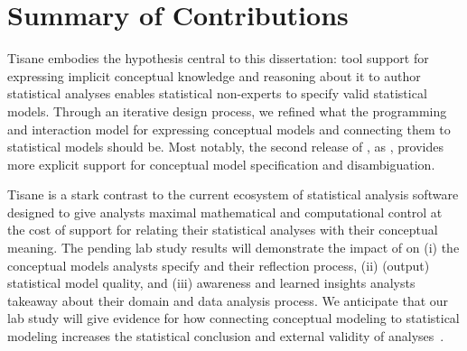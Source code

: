 












\section{Summary of Contributions}


Tisane embodies the hypothesis central to this dissertation: tool support for
expressing implicit conceptual knowledge and reasoning about it to author
statistical analyses enables statistical non-experts to specify valid
statistical models. Through an iterative design process, we refined what the
programming and interaction model for expressing conceptual models and
connecting them to statistical models should be. Most notably, the second
release of \tisane, as \rTisane, provides more explicit support for conceptual
model specification and disambiguation. 

Tisane is a stark contrast to the current ecosystem of statistical analysis
software designed to give analysts maximal mathematical and computational
control at the cost of support for relating their statistical analyses with
their conceptual meaning. The pending lab study results will demonstrate the
impact of \rTisane on (i) the conceptual models analysts specify and their
reflection process, (ii) (output) statistical model quality, and (iii) awareness
and learned insights analysts takeaway about their domain and data analysis
process. We anticipate that our lab study will give evidence for how connecting
conceptual modeling to statistical modeling increases the statistical conclusion
and external validity of analyses~\cite{shadish2010campbell}.  

